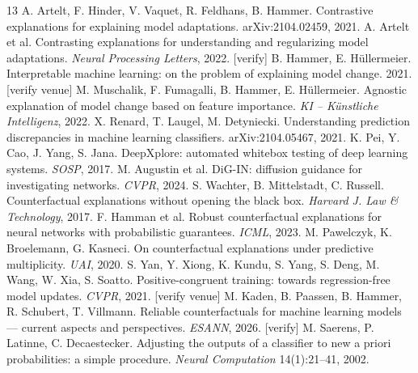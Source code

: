 \documentclass{esannV2}
\begin{document}
\begin{footnotesize}
\begin{thebibliography}{13}
 A. Artelt, F. Hinder, V. Vaquet, R. Feldhans, B. Hammer. Contrastive explanations for explaining model adaptations. arXiv:2104.02459, 2021.
 A. Artelt et al. Contrasting explanations for understanding and regularizing model adaptations. \emph{Neural Processing Letters}, 2022. [verify]
 B. Hammer, E. H\"ullermeier. Interpretable machine learning: on the problem of explaining model change. 2021. [verify venue]
 M. Muschalik, F. Fumagalli, B. Hammer, E. H\"ullermeier. Agnostic explanation of model change based on feature importance. \emph{KI -- K\"unstliche Intelligenz}, 2022.
 X. Renard, T. Laugel, M. Detyniecki. Understanding prediction discrepancies in machine learning classifiers. arXiv:2104.05467, 2021.
 K. Pei, Y. Cao, J. Yang, S. Jana. DeepXplore: automated whitebox testing of deep learning systems. \emph{SOSP}, 2017.
 M. Augustin et al. DiG-IN: diffusion guidance for investigating networks. \emph{CVPR}, 2024.
 S. Wachter, B. Mittelstadt, C. Russell. Counterfactual explanations without opening the black box. \emph{Harvard J. Law \& Technology}, 2017.
 F. Hamman et al. Robust counterfactual explanations for neural networks with probabilistic guarantees. \emph{ICML}, 2023.
 M. Pawelczyk, K. Broelemann, G. Kasneci. On counterfactual explanations under predictive multiplicity. \emph{UAI}, 2020.
 S. Yan, Y. Xiong, K. Kundu, S. Yang, S. Deng, M. Wang, W. Xia, S. Soatto. Positive-congruent training: towards regression-free model updates. \emph{CVPR}, 2021. [verify venue]
 M. Kaden, B. Paassen, B. Hammer, R. Schubert, T. Villmann. Reliable counterfactuals for machine learning models --- current aspects and perspectives. \emph{ESANN}, 2026. [verify]
 M. Saerens, P. Latinne, C. Decaestecker. Adjusting the outputs of a classifier to new a priori probabilities: a simple procedure. \emph{Neural Computation} 14(1):21--41, 2002.
\end{thebibliography}
\end{footnotesize}
\end{document}

